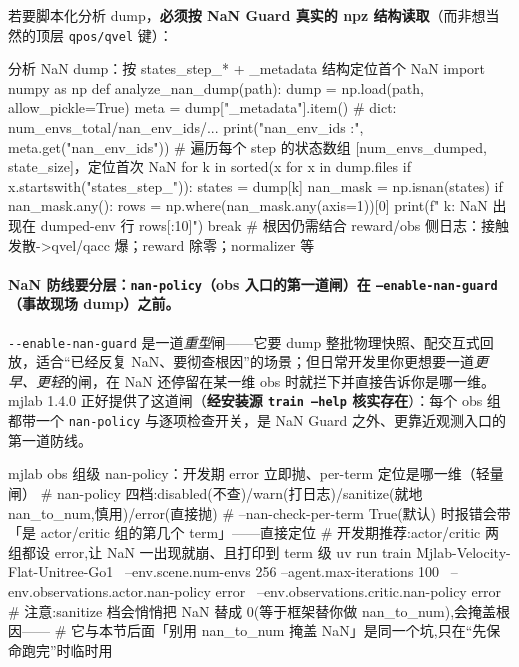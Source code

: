 若要脚本化分析 dump，\textbf{必须按 NaN Guard 真实的 npz 结构读取}（而非想当然的顶层 \verb|qpos/qvel| 键）：

\begin{codebox}[Python]{分析 NaN dump：按 states\_step\_* + \_metadata 结构定位首个 NaN}
import numpy as np
def analyze_nan_dump(path):
    dump = np.load(path, allow_pickle=True)
    meta = dump["_metadata"].item()                    # dict: num_envs_total/nan_env_ids/...
    print("nan_env_ids :", meta.get("nan_env_ids"))
    # 遍历每个 step 的状态数组 [num_envs_dumped, state_size]，定位首次 NaN
    for k in sorted(x for x in dump.files if x.startswith("states_step_")):
        states = dump[k]
        nan_mask = np.isnan(states)
        if nan_mask.any():
            rows = np.where(nan_mask.any(axis=1))[0]
            print(f"  {k}: NaN 出现在 dumped-env 行 {rows[:10]}")
            break
    # 根因仍需结合 reward/obs 侧日志：接触发散->qvel/qacc 爆；reward 除零；normalizer 等
\end{codebox}

\paragraph{\texorpdfstring{NaN 防线要分层：\texttt{nan-policy}（obs 入口的第一道闸）在 \texttt{--enable-nan-guard}（事故现场 dump）之前。}{NaN 防线要分层}}\verb|--enable-nan-guard| 是一道\emph{重型}闸——它要 dump 整批物理快照、配交互式回放，适合“已经反复 NaN、要彻查根因”的场景；但日常开发里你更想要一道\emph{更早、更轻}的闸，在 NaN 还停留在某一维 obs 时就拦下并直接告诉你是哪一维。mjlab 1.4.0 正好提供了这道闸（\textbf{经安装源 \texttt{train --help} 核实存在}）：每个 obs 组都带一个 \verb|nan-policy| 与逐项检查开关，是 NaN Guard 之外、更靠近观测入口的第一道防线。

\begin{codebox}[bash]{mjlab obs 组级 nan-policy：开发期 error 立即抛、per-term 定位是哪一维（轻量闸）}
# nan-policy 四档:disabled(不查)/warn(打日志)/sanitize(就地 nan_to_num,慎用)/error(直接抛)
#   --nan-check-per-term True(默认) 时报错会带「是 actor/critic 组的第几个 term」——直接定位
# 开发期推荐:actor/critic 两组都设 error,让 NaN 一出现就崩、且打印到 term 级
uv run train Mjlab-Velocity-Flat-Unitree-Go1 \
    --env.scene.num-envs 256 --agent.max-iterations 100 \
    --env.observations.actor.nan-policy error \
    --env.observations.critic.nan-policy error
# 注意:sanitize 档会悄悄把 NaN 替成 0(等于框架替你做 nan_to_num),会掩盖根因——
#   它与本节后面「别用 nan_to_num 掩盖 NaN」是同一个坑,只在“先保命跑完”时临时用
\end{codebox}

